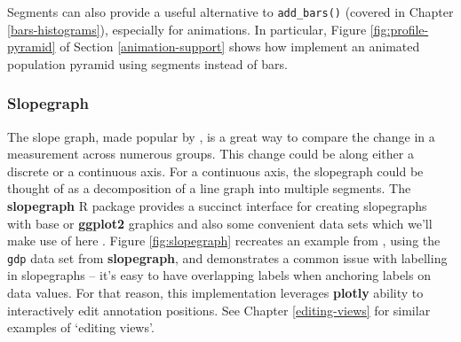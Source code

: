 \documentclass[
  12pt,
]{krantz}
\begin{document}
Segments can also provide a useful alternative to \texttt{add\_bars()} (covered in Chapter \ref{bars-histograms}), especially for animations. In particular, Figure \ref{fig:profile-pyramid} of Section \ref{animation-support} shows how implement an animated population pyramid using segments instead of bars.

\hypertarget{slopegraph}{%
\subsubsection{Slopegraph}\label{slopegraph}}

The slope graph, made popular by \citet{tufte2001}, is a great way to compare the change in a measurement across numerous groups. This change could be along either a discrete or a continuous axis. For a continuous axis, the slopegraph could be thought of as a decomposition of a line graph into multiple segments. The \textbf{slopegraph} R package provides a succinct interface for creating slopegraphs with base or \textbf{ggplot2} graphics and also some convenient data sets which we'll make use of here \citep{slopegraph}. Figure \ref{fig:slopegraph} recreates an example from \citet{tufte2001}, using the \texttt{gdp} data set from \textbf{slopegraph}, and demonstrates a common issue with labelling in slopegraphs -- it's easy to have overlapping labels when anchoring labels on data values. For that reason, this implementation leverages \textbf{plotly} ability to interactively edit annotation positions. See Chapter \ref{editing-views} for similar examples of `editing views'.
\end{document}
